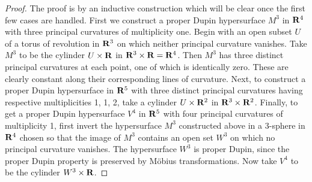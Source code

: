 \documentclass[10pt,a4paper]{amsart}
\begin{document}
\begin{proof}
The proof is by an inductive construction
which will be clear once the first few cases are handled.
First we construct a proper Dupin hypersurface $M^3$ in 
${\bf R}^4$ with three principal curvatures of multiplicity
one. Begin with an open subset $U$ of a torus of
revolution in ${\bf R}^3$ on which neither principal
curvature vanishes.  Take $M^3$ to be the cylinder
$U \times {\bf R}$ in ${\bf R}^3 \times {\bf R} =
{\bf R}^4$.  Then $M^3$ has three distinct principal
curvatures at each point, one of which is identically
zero.  These are clearly constant along their
corresponding lines of curvature.
Next, to construct a proper Dupin hypersurface in ${\bf R}^5$
with three distinct principal curvatures having
respective multiplicities 1, 1, 2, take a cylinder
$U \times {\bf R}^2$ in ${\bf R}^3 \times {\bf R}^2$. Finally,
to get a proper Dupin hypersurface $V^4$ in
${\bf R}^5$ with four principal curvatures of multiplicity 1, first 
invert the hypersurface $M^3$ constructed above in a 3-sphere
in ${\bf R}^4$ chosen so that the image of $M^3$
contains an open set $W^3$ on which no principal
curvature vanishes.  The hypersurface $W^3$ is proper Dupin, since the proper Dupin property is preserved by
M\"{o}bius transformations.
Now take $V^4$ to be the
cylinder $W^3 \times {\bf R}$. 
\end{proof}
\end{document}

